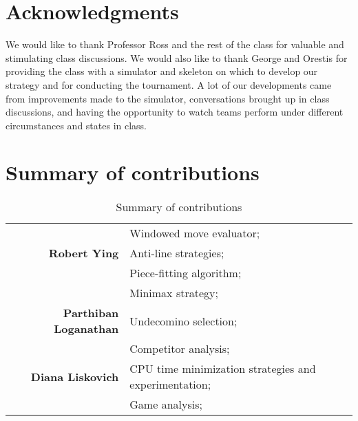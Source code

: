 \documentclass{scrartcl}
\begin{document}

\section{Acknowledgments} %

We would like to thank Professor Ross and the rest of the class for valuable and stimulating class discussions. We would also like to thank George and Orestis for providing the class with a simulator and skeleton on which to develop our strategy and for conducting the tournament. A lot of our developments came from improvements made to the simulator, conversations brought up in class discussions, and having the opportunity to watch teams perform under different circumstances and states in class.  


\FloatBarrier

\appendix

\section{Summary of contributions} %

\begin{table}[h]
    \centering
    \caption{Summary of contributions}
    \begin{tabular}{|r|l|} \hline
                                          & Windowed move evaluator; \\
        \textbf{Robert Ying}              & Anti-line strategies; \\
                                          & Piece-fitting algorithm; \\ \hline
                                          & Minimax strategy; \\
        \textbf{Parthiban Loganathan}     & Undecomino selection; \\
                                          & Competitor analysis; \\ \hline
        \textbf{Diana Liskovich}          & CPU time minimization strategies and experimentation; \\
                                          & Game analysis; \\ \hline
    \end{tabular}\label{tbl:contrib}
\end{table}
\end{document}
